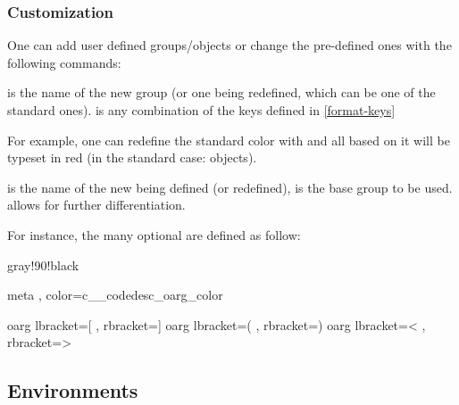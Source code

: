 \documentclass{article}
\begin{document}
\subsubsection{Customization}\label{format-custom}

One can add user defined groups/objects or change the pre-defined ones with the following commands:


\begin{codedescribe}[code,new=2023/05/16]{}
\begin{codesyntax} %
\end{codesyntax}
 is the name of the new group (or one being redefined, which can be one of the standard ones).  is any combination of the keys defined in \ref{format-keys}
\end{codedescribe}

For example, one can redefine the  standard color with  and all  based on it will be typeset in red (in the standard case:  objects).


\begin{codedescribe}[code,new=2023/05/16]{}
\begin{codesyntax} %
\end{codesyntax}
 is the name of the new  being defined (or redefined),
 is the base group to be used.  allows for further differentiation.
\end{codedescribe}
For instance, the many optional  are defined as follow:
\begin{codestore}
 { gray!90!black }

 { meta , color=c__codedesc_oarg_color }

 {oarg} { lbracket={[} , rbracket={]} }
 {oarg} { lbracket={(} , rbracket={)} }
 {oarg} { lbracket={<} , rbracket={>} }
\end{codestore}

\subsection{Environments}
\end{document}
